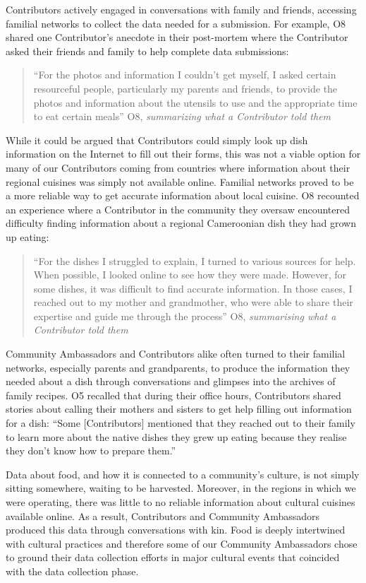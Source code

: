 Contributors actively engaged in conversations with family and friends, accessing familial networks to collect the data needed for a submission. For example, O8 shared one Contributor's anecdote in their post-mortem where the Contributor asked their friends and family to help complete data submissions:
\begin{quote}
    ``For the photos and information I couldn’t get myself, I asked certain resourceful people, particularly my parents and friends, to provide the photos and information about the utensils to use and the appropriate time to eat certain meals'' O8, \textit{summarizing what a Contributor told them}
\end{quote}
While it could be argued that Contributors could simply look up dish information on the Internet to fill out their forms, this was not a viable option for many of our Contributors coming from countries where information about their regional cuisines was simply not available online. Familial networks proved to be a more reliable way to get accurate information about local cuisine. O8 recounted an experience where a Contributor in the community they oversaw encountered difficulty finding information about a regional Cameroonian dish they had grown up eating:
\begin{quote}
    ``For the dishes I struggled to explain, I turned to various sources for help. When possible, I looked online to see how they were made. However, for some dishes, it was difficult to find accurate information. In those cases, I reached out to my mother and grandmother, who were able to share their expertise and guide me through the process'' O8, \textit{summarising what a Contributor told them}
\end{quote}
Community Ambassadors and Contributors alike often turned to their familial networks, especially parents and grandparents, to produce the information they needed about a dish through conversations and glimpses into the archives of family recipes. O5 recalled that during their office hours, Contributors shared stories about calling their mothers and sisters to get help filling out information for a dish: ``Some [Contributors] mentioned that they reached out to their family to learn more about the native dishes they grew up eating because they realise they don't know how to prepare them.''  

Data about food, and how it is connected to a community's culture, is not simply sitting somewhere, waiting to be harvested. Moreover, in the regions in which we were operating, there was little to no reliable information about cultural cuisines available online. As a result, Contributors and Community Ambassadors produced this data through conversations with kin. Food is deeply intertwined with cultural practices and therefore some of our Community Ambassadors chose to ground their data collection efforts in major cultural events that coincided with the data collection phase. 

